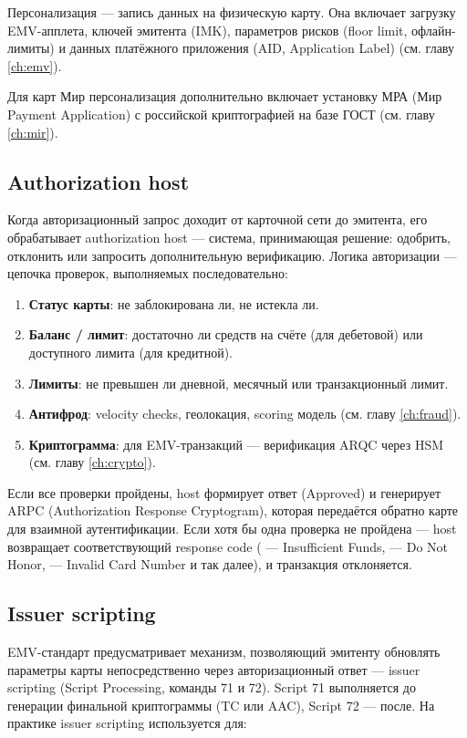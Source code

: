 Персонализация — запись данных на физическую карту. Она включает
загрузку EMV-апплета, ключей эмитента (IMK), параметров рисков
(floor limit, офлайн-лимиты) и данных платёжного приложения
(AID, Application Label) (см. главу \ref{ch:emv}).

Для карт Мир персонализация дополнительно включает установку МРА
(Мир Payment Application) с российской криптографией на базе
ГОСТ (см. главу \ref{ch:mir}).

\subsection*{Authorization host}

Когда авторизационный запрос доходит от карточной сети
до эмитента, его обрабатывает authorization host — система,
принимающая решение: одобрить, отклонить или запросить
дополнительную верификацию. Логика авторизации — цепочка
проверок, выполняемых последовательно:

\begin{enumerate}
  \item \textbf{Статус карты}: не заблокирована ли, не истекла ли.
  \item \textbf{Баланс / лимит}: достаточно ли средств на счёте
        (для дебетовой) или доступного лимита (для кредитной).
  \item \textbf{Лимиты}: не превышен ли дневной, месячный
        или транзакционный лимит.
  \item \textbf{Антифрод}: velocity checks, геолокация, scoring
        модель (см. главу \ref{ch:fraud}).
  \item \textbf{Криптограмма}: для EMV-транзакций —
        верификация ARQC через
        HSM (см. главу \ref{ch:crypto}).
\end{enumerate}

Если все проверки пройдены, host формирует ответ 
(Approved) и генерирует ARPC (Authorization Response
Cryptogram), которая передаётся обратно карте для взаимной
аутентификации. Если хотя бы одна проверка не пройдена —
host возвращает соответствующий response code ( —
Insufficient Funds,  — Do Not Honor,  —
Invalid Card Number и так далее), и транзакция отклоняется.

\subsection*{Issuer scripting}

EMV-стандарт предусматривает механизм, позволяющий эмитенту обновлять параметры карты непосредственно через
авторизационный ответ — issuer scripting (Script Processing, команды 71 и 72). Script 71 выполняется до генерации
финальной криптограммы (TC или AAC), Script 72 — после. На практике issuer scripting используется для:

